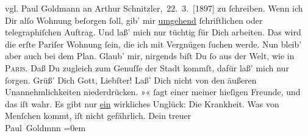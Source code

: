 \begin{ledgroupsized}[t]{13cm}
{{{                     vgl. Paul Goldmann an Arthur Schnitzler, 22. 3. [1897]}}}\label{K_L02803-3h} zu ſchreiben. Wenn ich Dir alſo Wohnung beſorgen ſoll, gib’ mir \uline{umgehend} ſchriftlichen oder telegraphiſchen Auftrag.
               Und laß’ mich nur tüchtig für Dich arbeiten. {\pb}Das
               wird die erſte Pariſer Wohnung ſein, die ich mit
               Vergnügen ſuchen werde.\pend
           \pstart
           Nun bleib’ aber auch bei dem Plan. Glaub’ mir, nirgends biſt Du ſo aus der Welt, wie
               in \textsc{Paris}. Daß Du zugleich zum Genuſſe der Stadt kommſt, dafür laß’ mich nur  ſorgen.\pend
           \pstart
           Grüß’ Dich Gott, Liebſter! Laß’ Dich nicht von den äußeren Unannehmlichkeiten
               niederdrücken. »\label{K_L02803-5v}\label{K_L02803-5h}« ſagt einer meiner hieſigen Freunde, und das iſt wahr. {\pb}Es gibt nur \uline{ein}
               wirkliches Unglück: Die Krankheit. Was von Menſchen kommt, iſt nicht gefährlich.\pend
           \pstart
           Dein treuer {\\[\baselineskip]}\spacefill\mbox{Paul Goldmnn}\pend
           \leftskip=0em{}
         
         \endnumbering{}\end{ledgroupsized}  \newcommand{\dateiname}{L02803}\newcommand{\titel}{Paul Goldmann an Arthur Schnitzler, 16. 2. [1897]}\newcommand{\editorInnen}{Martin Anton Müller und Laura Untner}
      